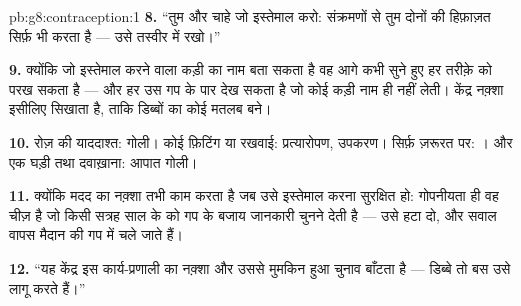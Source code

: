 \begin{solution}{pb:g8:contraception:1}
\textbf{8.} ``तुम और चाहे जो इस्तेमाल करो: संक्रमणों से तुम दोनों की
हिफ़ाज़त सिर्फ़  भी करता है --- उसे तस्वीर में रखो।''

\textbf{9.} क्योंकि जो इस्तेमाल करने वाला कड़ी का नाम बता सकता है वह
आगे कभी सुने हुए हर तरीक़े को परख सकता है --- और हर उस गप के पार देख
सकता है जो कोई कड़ी नाम ही नहीं लेती। केंद्र नक़्शा इसीलिए सिखाता है,
ताकि डिब्बों का कोई मतलब बने।

\textbf{10.} रोज़ की याददाश्त: गोली। कोई फ़िटिंग या रखवाई:
प्रत्यारोपण, उपकरण। सिर्फ़ ज़रूरत पर: । और एक घड़ी तथा दवाख़ाना:
आपात गोली।

\textbf{11.} क्योंकि मदद का नक़्शा तभी काम करता है जब उसे इस्तेमाल करना
सुरक्षित हो: गोपनीयता ही वह चीज़ है जो किसी सत्रह साल के को गप के बजाय
जानकारी चुनने देती है --- उसे हटा दो, और सवाल वापस मैदान की गप में चले
जाते हैं।

\textbf{12.} ``यह केंद्र इस कार्य-प्रणाली का नक़्शा और उससे मुमकिन हुआ
चुनाव बाँटता है --- डिब्बे तो बस उसे लागू करते हैं।''
\end{solution}
